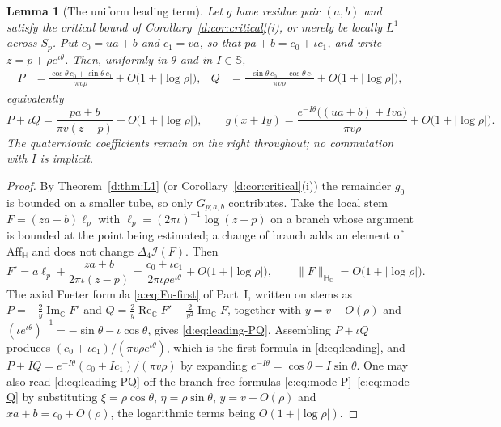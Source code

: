 \documentclass[11pt,a4paper]{article}
\numberwithin{equation}{section}
\newtheorem{lemma}[theorem]{Lemma}
\theoremstyle{definition}
\theoremstyle{remark}
\theoremstyle{plain}
\newcommand{\HH}{\mathbb H}
\newcommand{\HC}{\mathbb H_{\mathbb C}}
\newcommand{\CC}{\mathbb C}
\newcommand{\SSS}{\mathbb S}
\DeclareMathOperator{\Rea}{Re}
\DeclareMathOperator{\Ima}{Im}
\newcommand{\lap}{\Delta_4}
\newcommand{\I}{\mathcal I}
\newcommand{\Aff}{\mathrm{Aff}_{\HH}}
\newcommand{\Sp}{S_{p}}
\newcommand{\abs}[1]{\lvert #1\rvert}
\newcommand{\norm}[1]{\lVert #1\rVert}
\begin{document}
\begin{lemma}[The uniform leading term]
\label{d:lem:leading}
Let $g$ have residue pair $(a,b)$ and satisfy the critical bound of
Corollary~\ref{d:cor:critical}\textup{(i)}, or merely be locally $L^1$
across $\Sp$.  Put $c_0=ua+b$ and $c_1=va$, so that $pa+b=c_0+\iota c_1$,
and write $z=p+\rho e^{\iota\theta}$.  Then, uniformly in $\theta$ and in
$I\in\SSS$,
\begin{align}
 P&=\frac{\cos\theta\,c_0+\sin\theta\,c_1}{\pi v\rho}
     +O\bigl(1+\abs{\log\rho}\bigr),
 &
 Q&=\frac{-\sin\theta\,c_0+\cos\theta\,c_1}{\pi v\rho}
     +O\bigl(1+\abs{\log\rho}\bigr),
 \label{d:eq:leading-PQ}
\end{align}
equivalently
\begin{equation}
 P+\iota Q=\frac{pa+b}{\pi v(z-p)}+O\bigl(1+\abs{\log\rho}\bigr),
 \qquad
 g(x+Iy)=\frac{e^{-I\theta}\bigl((ua+b)+Iva\bigr)}{\pi v\rho}
         +O\bigl(1+\abs{\log\rho}\bigr).
 \label{d:eq:leading}
\end{equation}
The quaternionic coefficients remain on the right throughout; no
commutation with $I$ is implicit.
\end{lemma}

\begin{proof}
By Theorem~\ref{d:thm:L1} (or Corollary~\ref{d:cor:critical}(i)) the
remainder $g_0$ is bounded on a smaller tube, so only $G_{p;a,b}$
contributes.  Take the local stem $F=(za+b)\ell_p$ with
$\ell_p=(2\pi\iota)^{-1}\log(z-p)$ on a branch whose argument is bounded at
the point being estimated; a change of branch adds an element of $\Aff$ and
does not change $\lap\I(F)$.  Then
\[
 F'=a\ell_p+\frac{za+b}{2\pi\iota(z-p)}
   =\frac{c_0+\iota c_1}{2\pi\iota\rho e^{\iota\theta}}
    +O\bigl(1+\abs{\log\rho}\bigr),
 \qquad
 \norm F_{\HC}=O\bigl(1+\abs{\log\rho}\bigr).
\]
The axial Fueter formula \eqref{a:eq:Fu-first} of Part~I, written on stems
as
$P=-\tfrac2y\Ima_{\CC}F'$ and
$Q=\tfrac2y\Rea_{\CC}F'-\tfrac2{y^2}\Ima_{\CC}F$, together with
$y=v+O(\rho)$ and $(\iota e^{\iota\theta})^{-1}
 =-\sin\theta-\iota\cos\theta$, gives \eqref{d:eq:leading-PQ}.  Assembling
$P+\iota Q$ produces $(c_0+\iota c_1)/(\pi v\rho e^{\iota\theta})$, which
is the first formula in \eqref{d:eq:leading}, and
$P+IQ=e^{-I\theta}(c_0+Ic_1)/(\pi v\rho)$ by expanding
$e^{-I\theta}=\cos\theta-I\sin\theta$.  One may also read
\eqref{d:eq:leading-PQ} off the branch-free formulas
\eqref{c:eq:mode-P}--\eqref{c:eq:mode-Q} by
substituting $\xi=\rho\cos\theta$, $\eta=\rho\sin\theta$, $y=v+O(\rho)$ and
$xa+b=c_0+O(\rho)$, the logarithmic terms being $O(1+\abs{\log\rho})$.
\end{proof}
\end{document}
